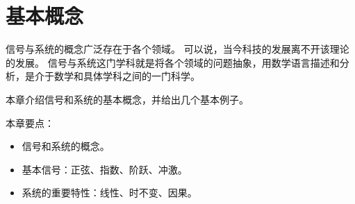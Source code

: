 \chapter{基本概念}

信号与系统的概念广泛存在于各个领域。
可以说，当今科技的发展离不开该理论的发展。
信号与系统这门学科就是将各个领域的问题抽象，用数学语言描述和分析，是介于数学和具体学科之间的一门科学。

本章介绍信号和系统的基本概念，并给出几个基本例子。

本章要点：
\begin{itemize}
    \item 信号和系统的概念。
    \item 基本信号：正弦、指数、阶跃、冲激。
    \item 系统的重要特性：线性、时不变、因果。
\end{itemize}

\newpage


\newpage


\newpage


\newpage


\newpage


\newpage





